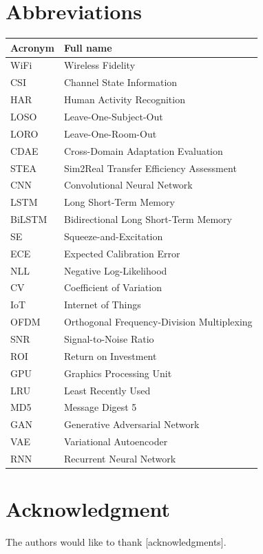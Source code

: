 \documentclass[journal]{IEEEtran}
\begin{document}
\section*{Abbreviations}
\begin{table}[h]
\centering
\begin{tabular}{@{}ll@{}}
\toprule
\textbf{Acronym} & \textbf{Full name} \\
\midrule
WiFi & Wireless Fidelity \\
CSI & Channel State Information \\
HAR & Human Activity Recognition \\
LOSO & Leave-One-Subject-Out \\
LORO & Leave-One-Room-Out \\
CDAE & Cross-Domain Adaptation Evaluation \\
STEA & Sim2Real Transfer Efficiency Assessment \\
CNN & Convolutional Neural Network \\
LSTM & Long Short-Term Memory \\
BiLSTM & Bidirectional Long Short-Term Memory \\
SE & Squeeze-and-Excitation \\
ECE & Expected Calibration Error \\
NLL & Negative Log-Likelihood \\
CV & Coefficient of Variation \\
IoT & Internet of Things \\
OFDM & Orthogonal Frequency-Division Multiplexing \\
SNR & Signal-to-Noise Ratio \\
ROI & Return on Investment \\
GPU & Graphics Processing Unit \\
LRU & Least Recently Used \\
MD5 & Message Digest 5 \\
GAN & Generative Adversarial Network \\
VAE & Variational Autoencoder \\
RNN & Recurrent Neural Network \\
\bottomrule
\end{tabular}
\end{table}

\section*{Acknowledgment}

The authors would like to thank [acknowledgments].




\end{document}
